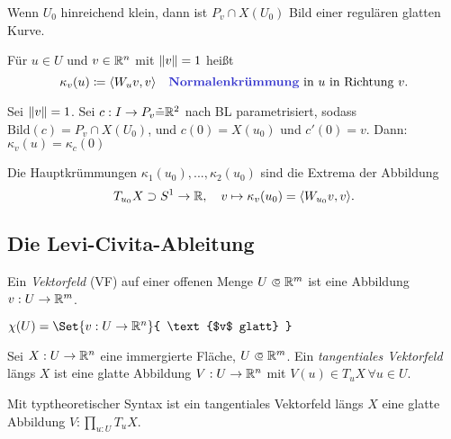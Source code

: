 \documentclass{cheat-sheet}
\newcommand{\Bild}{\mathrm{Bild}}
\begin{document}
\begin{satz}
  Wenn $U_0$ hinreichend klein, dann ist $P_v \cap X(U_0)$ Bild einer regulären glatten Kurve.
\end{satz}

\begin{defn}
  Für $u \in U$ und $v \in \mathbb{R}^n$ mit $\lVert v\rVert = 1$ heißt
  \[
    \kappa_v(u) \coloneqq \langle W_u v, v \rangle
    \quad \text{\emph{Normalenkrümmung} in $u$ in Richtung $v$}.
  \]
\end{defn}

\begin{samepage}

\begin{bem}
  Sei $\lVert v\rVert = 1$. Sei $c : I \to P_v \tilde{=} \mathbb{R}^2$ nach BL parametrisiert, sodass $\Bild(c) = P_v \cap X(U_0)$, und $c(0) = X(u_0)$ und $c'(0) = v$. Dann: $\kappa_v(u) = \kappa_c(0)$
\end{bem}

\begin{satz}
  Die Hauptkrümmungen $\kappa_1(u_0), ..., \kappa_2(u_0)$ sind die Extrema der Abbildung
  \[ T_{u_0} X \supset S^1 \to \mathbb{R}, \quad v \mapsto \kappa_v(u_0) = \langle W_{u_0} v, v \rangle. \]
\end{satz}

\subsection{Die Levi-Civita-Ableitung}

\end{samepage}

\begin{defn}
  Ein \emph{Vektorfeld} (VF) auf einer offenen Menge $U \opn \R^m$ ist eine Abbildung $v : U \to \mathbb{R}^m$.
\end{defn}

\begin{nota}
  $\chi(U) = \Set{ v : U \to \R^n }{ \text{$v$ glatt} }$
\end{nota}

\begin{defn}
  Sei $X : U \to \mathbb{R}^n$ eine immergierte Fläche, $U \opn \R^m$. Ein \emph{tangentiales Vektorfeld} längs $X$ ist eine glatte Abbildung $V : U \to \mathbb{R}^n$ mit $V(u) \in T_u X \, \forall u \in U$.
\end{defn}

\begin{bem}
  Mit typtheoretischer Syntax ist ein tangentiales Vektorfeld längs $X$ eine glatte Abbildung $V : \prod_{u : U} T_u X$.
\end{bem}
\end{document}
